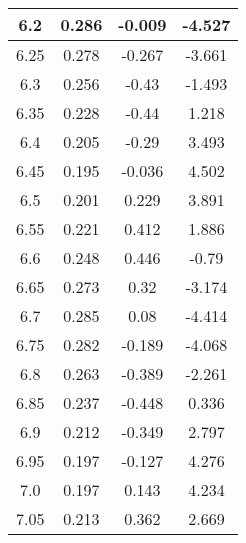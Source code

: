 \begin{multicols}{2}
\begin{longtable}{|c|c|c|c|}
    \hline
    6.2      & 0.286        & -0.009                                 & -4.527                                       \\
    \hline
    6.25     & 0.278        & -0.267                                 & -3.661                                       \\
    \hline
    6.3      & 0.256        & -0.43                                  & -1.493                                       \\
    \hline
    6.35     & 0.228        & -0.44                                  & 1.218                                        \\
    \hline
    6.4      & 0.205        & -0.29                                  & 3.493                                        \\
    \hline
    6.45     & 0.195        & -0.036                                 & 4.502                                        \\
    \hline
    6.5      & 0.201        & 0.229                                  & 3.891                                        \\
    \hline
    6.55     & 0.221        & 0.412                                  & 1.886                                        \\
    \hline
    6.6      & 0.248        & 0.446                                  & -0.79                                        \\
    \hline
    6.65     & 0.273        & 0.32                                   & -3.174                                       \\
    \hline
    6.7      & 0.285        & 0.08                                   & -4.414                                       \\
    \hline
    6.75     & 0.282        & -0.189                                 & -4.068                                       \\
    \hline
    6.8      & 0.263        & -0.389                                 & -2.261                                       \\
    \hline
    6.85     & 0.237        & -0.448                                 & 0.336                                        \\
    \hline
    6.9      & 0.212        & -0.349                                 & 2.797                                        \\
    \hline
    6.95     & 0.197        & -0.127                                 & 4.276                                        \\
    \hline
    7.0      & 0.197        & 0.143                                  & 4.234                                        \\
    \hline
    7.05     & 0.213        & 0.362                                  & 2.669                                        \\
    \hline
    


\end{longtable}
\end{multicols}
